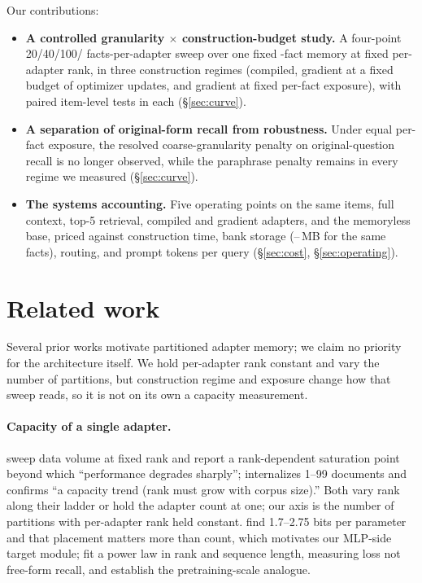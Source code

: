\documentclass{article}
\begin{document}
Our contributions:
\begin{itemize}
  \item \textbf{A controlled granularity $\times$ construction-budget study.} A
        four-point 20/40/100/\NPerArm{} facts-per-adapter sweep over one fixed
        \NPerArm{}-fact memory at fixed per-adapter rank, in three construction
        regimes (compiled, gradient at a fixed budget of \SeedSteps{} optimizer
        updates, and gradient at fixed per-fact exposure), with paired item-level
        tests in each (\S\ref{sec:curve}).
  \item \textbf{A separation of original-form recall from robustness.} Under
        equal per-fact exposure, the resolved coarse-granularity penalty on
        original-question recall is no longer observed, while the paraphrase
        penalty remains in every regime we measured (\S\ref{sec:curve}).
  \item \textbf{The systems accounting.} Five operating points on the same
        items, full context, top-5 retrieval, compiled and gradient adapters,
        and the memoryless base, priced against construction time, bank storage
        (\GTwoHundredTotMB{}--\GTwentyTotMB{}\,MB for the same facts), routing,
        and prompt tokens per query (\S\ref{sec:cost}, \S\ref{sec:operating}).
\end{itemize}

\section{Related work}
\label{sec:related}

Several prior works motivate partitioned adapter memory; we claim no priority for
the architecture itself. We hold per-adapter rank constant and vary the number of
partitions, but construction regime and exposure change how that sweep reads, so
it is not on its own a capacity measurement.

\paragraph{Capacity of a single adapter.} \citet{loramem} sweep data volume at
fixed rank and report a rank-dependent saturation point beyond which
``performance degrades sharply''; \citet{dataquality} internalizes 1--99 documents
and confirms ``a capacity trend (rank must grow with corpus size).'' Both vary
rank along their ladder or hold the adapter count at one; our axis is the number
of partitions with per-adapter rank held constant. \citet{adapterbits} find
1.7--2.75 bits per parameter and that placement matters more than count, which
motivates our MLP-side target module; \citet{memorylaw} fit a power law in rank
and sequence length, measuring loss not free-form recall, and
\citet{knowledgecapacity} establish the pretraining-scale analogue.
\end{document}

